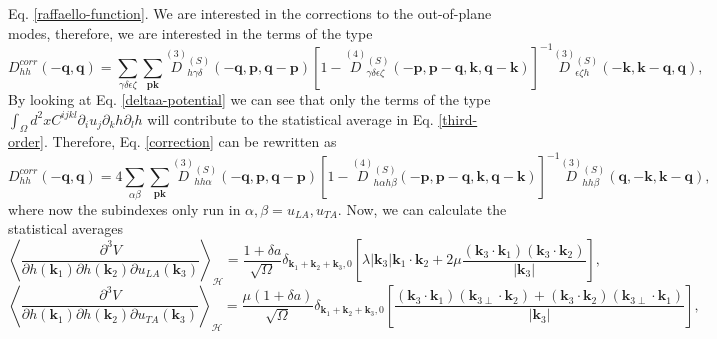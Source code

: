 Eq. \ref{raffaello-function}. We are interested in the corrections to the out-of-plane modes, therefore, we are
interested in the terms of the type
\begin{equation}
D_{hh}^{corr}(-\boldsymbol{q},\boldsymbol{q})=\sum_{\gamma\delta\epsilon\zeta}\sum_{\boldsymbol{p}\boldsymbol{k}}\overset{(3)}{D}{}^{(S)}_{h\gamma\delta}(-\boldsymbol{q},\boldsymbol{p},
\boldsymbol{q}-\boldsymbol{p})[1-\overset{(4)}{D}{}^{(S)}_{\gamma\delta\epsilon\zeta}(-\boldsymbol{p},\boldsymbol{p}-\boldsymbol{q},\boldsymbol{k},\boldsymbol{q}-\boldsymbol{k})]^{-1}\overset{(3)}{D}{}^{(S)}_{
 \epsilon\zeta h}(-\boldsymbol{k},\boldsymbol{k}-\boldsymbol{q},\boldsymbol{q}),
\end{equation}
By looking at Eq. \ref{deltaa-potential} we can see that only the terms of the type $\int_{\Omega}{d^{2}xC^{ijkl}\partial_{i}u_{j}\partial_{k}h\partial_{l}h}$ will contribute to the statistical average in
Eq. \ref{third-order}. Therefore, Eq. \ref{correction} can be rewritten as
\begin{equation}
\label{correction-simple}
D_{hh}^{corr}(-\boldsymbol{q},\boldsymbol{q})=4\sum_{\alpha\beta}\sum_{\boldsymbol{p}\boldsymbol{k}}\overset{(3)}{D}{}^{(S)}_{hh\alpha}(-\boldsymbol{q},\boldsymbol{p},\boldsymbol{q}-\boldsymbol{p})[
1-\overset{(4)}{D}{}^{(S)}_{h\alpha h\beta}(-\boldsymbol{p},\boldsymbol{p}-\boldsymbol{q},\boldsymbol{k},\boldsymbol{q}-\boldsymbol{k})]^{-1}\overset{(3)}{D}{}^{(S)}_{hh\beta}(\boldsymbol{q},-\boldsymbol{k},\boldsymbol{k}-\boldsymbol{q}),
\end{equation}
where now the subindexes only run in $\alpha,\beta=u_{LA},u_{TA}$. Now, we can calculate the statistical averages
\begin{equation}
 \left\langle\frac{\partial^{3}V}{\partial h(\boldsymbol{k}_{1})\partial h(\boldsymbol{k}_{2})\partial u_{LA}(\boldsymbol{k}_{3})}\right\rangle_{\mathcal{H}}=\frac{1+\delta a}{\sqrt{\Omega}}\delta_{\boldsymbol{k}_{1}+\boldsymbol{
 k}_{2}+\boldsymbol{k}_{3},0}\left[\lambda|\boldsymbol{k}_{3}|\boldsymbol{k}_{1}\cdot\boldsymbol{k}_{2}+2\mu\frac{(\boldsymbol{k}_{3}\cdot\boldsymbol{k}_{1})(\boldsymbol{k}_{3}\cdot\boldsymbol{k}_{2})}{|\boldsymbol{k}_{3}|}\right],
\end{equation}
\begin{equation}
 \left\langle\frac{\partial^{3}V}{\partial h(\boldsymbol{k}_{1})\partial h(\boldsymbol{k}_{2})\partial u_{TA}(\boldsymbol{k}_{3})}\right\rangle_{\mathcal{H}}=\frac{\mu(1+\delta a)}{\sqrt{\Omega}}\delta_{\boldsymbol{k}_{
 1}+\boldsymbol{k}_{2}+\boldsymbol{k}_{3},0}\left[\frac{(\boldsymbol{k}_{3}\cdot\boldsymbol{k}_{1})(\boldsymbol{k}_{3\perp}\cdot\boldsymbol{k}_{2})+(\boldsymbol{k}_{3}\cdot\boldsymbol{k}_{2})(\boldsymbol{k}_{3\perp}\cdot
 \boldsymbol{k}_{1})}{|\boldsymbol{k}_{3}|}\right],
\end{equation}
